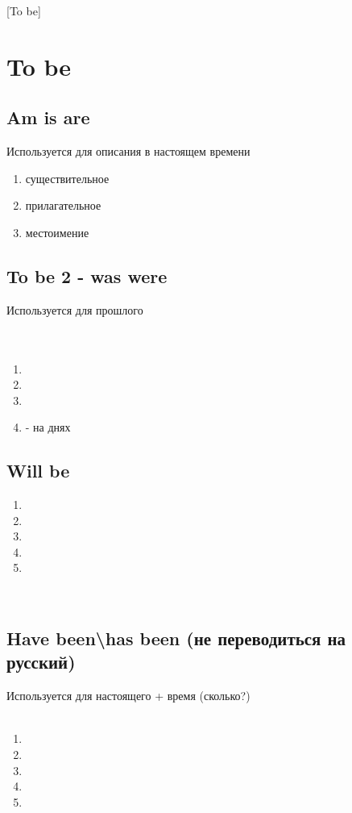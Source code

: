 [To be]

\section{To be}
\subsection{Am is are}
\p
Используется для описания в настоящем времени
\begin{enumerate}
    \item существительное
    \item прилагательное
    \item местоимение
\end{enumerate}
\subsection{To be 2 - was were}
\p
Используется для прошлого\\
\\
\\
\begin{enumerate}
    \item {}
    \item {}
    \item {}
    \item {} - на днях
\end{enumerate}
\subsection{Will be}
\p
{}
\begin{enumerate}
    \item {}
    \item {}
    \item {}
    \item {}
    \item {}
\end{enumerate}
\\
\subsection{Have been\textbackslash has been (не переводиться на русский)}
\p
Используется для настоящего + время (сколько?)\\
\\
\begin{enumerate}
    \item {}
    \item {}
    \item {}
    \item {}
    \item {}
\end{enumerate}
